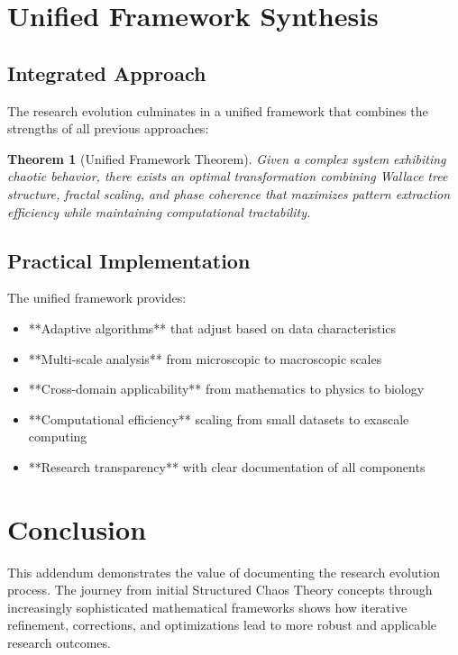 \documentclass[12pt]{article}
\newtheorem{theorem}{Theorem}
\begin{document}
\section{Unified Framework Synthesis}

\subsection{Integrated Approach}

The research evolution culminates in a unified framework that combines the strengths of all previous approaches:

\begin{theorem}[Unified Framework Theorem]
Given a complex system exhibiting chaotic behavior, there exists an optimal transformation combining Wallace tree structure, fractal scaling, and phase coherence that maximizes pattern extraction efficiency while maintaining computational tractability.
\end{theorem}

\subsection{Practical Implementation}

The unified framework provides:
\begin{itemize}
    \item **Adaptive algorithms** that adjust based on data characteristics
    \item **Multi-scale analysis** from microscopic to macroscopic scales
    \item **Cross-domain applicability** from mathematics to physics to biology
    \item **Computational efficiency** scaling from small datasets to exascale computing
    \item **Research transparency** with clear documentation of all components
\end{itemize}

\section{Conclusion}

This addendum demonstrates the value of documenting the research evolution process. The journey from initial Structured Chaos Theory concepts through increasingly sophisticated mathematical frameworks shows how iterative refinement, corrections, and optimizations lead to more robust and applicable research outcomes.
\end{document}
